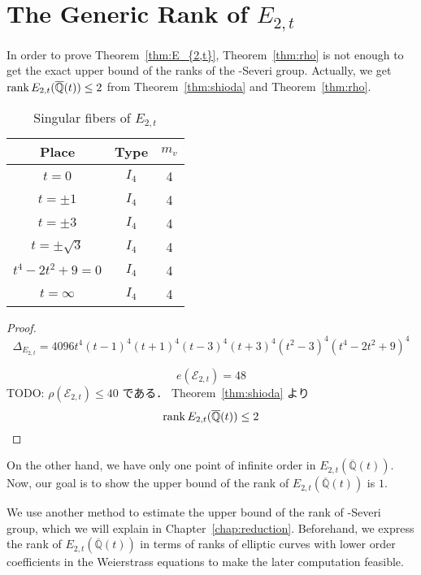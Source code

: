 \documentclass[main]{subfiles}
\begin{document}
\chapter{The Generic Rank of $E_{2,t}$}

In order to prove Theorem~\ref{thm:E_{2,t}}, Theorem~\ref{thm:rho} is not enough to get the exact upper bound of the ranks of the \Neron-Severi group.
Actually, we get $\operatorname{rank} E_{2,t}(\overline{\mathbb{Q}}(t)) \leq 2$ from Theorem~\ref{thm:shioda} and Theorem~\ref{thm:rho}.
\begin{table}[h]
    \centering
    \caption{Singular fibers of $E_{2,t}$}
    \begin{tabular}{|c|c|c|}
        \hline
        Place            & Type  & $m_v$ \\
        \hline
        $t=0$            & $I_4$ & 4     \\
        $t=\pm 1$        & $I_4$ & 4     \\
        $t=\pm 3$        & $I_4$ & 4     \\
        $t=\pm \sqrt{3}$ & $I_4$ & 4     \\
        $t^4-2t^2+9=0$   & $I_4$ & 4     \\
        $t=\infty$       & $I_4$ & 4     \\
        \hline
    \end{tabular}
\end{table}
\begin{proof}
    \begin{equation}
        \Delta_{E_{2,t}} = 4096t^{4}(t - 1)^{4}(t + 1)^{4}(t - 3)^{4}(t + 3)^{4}(t^{2} - 3)^{4}(t^{4} - 2t^{2} + 9)^{4}
    \end{equation}

    \begin{equation}
        e(\mathcal{E}_{2,t}) = 48
    \end{equation}
    TODO: $\rho(\mathcal{E}_{2,t}) \leq 40$ である．
    Theorem~\ref{thm:shioda} より
    \begin{equation}
        \operatorname{rank} E_{2,t}(\overline{\mathbb{Q}}(t)) \leq 2
    \end{equation}
\end{proof}
On the other hand, we have only one point of infinite order in $E_{2,t}(\overline{\mathbb{Q}}(t))$.
Now, our goal is to show the upper bound of the rank of $E_{2,t}(\overline{\mathbb{Q}}(t))$ is $1$.

We use another method to estimate the upper bound of the rank of \Neron-Severi group, which we will explain in Chapter~\ref{chap:reduction}.
Beforehand, we express the rank of $E_{2,t}(\overline{\mathbb{Q}}(t))$ in terms of ranks of elliptic curves with lower order coefficients in the Weierstrass equations to make the later computation feasible.
\end{document}

